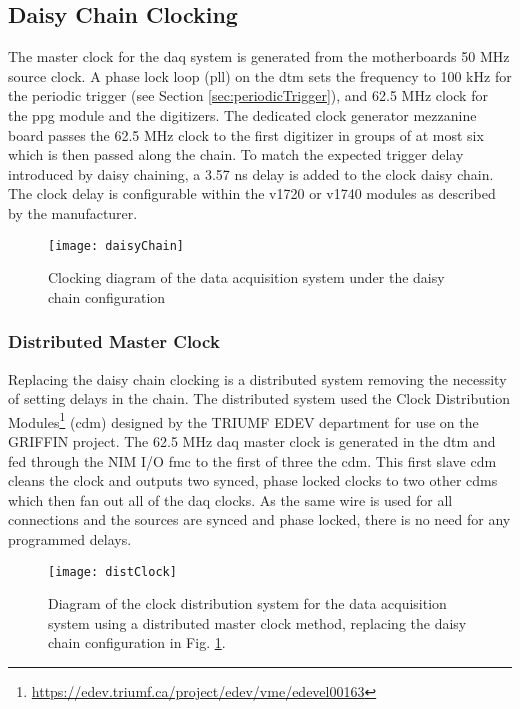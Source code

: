 \subsection{Daisy Chain Clocking}
\label{sec:daisyChainClock}
The master clock for the \gls{daq} system is generated from the motherboards 50 MHz source clock. A phase lock loop (\gls{pll}) on the \gls{dtm} sets the frequency to 100 kHz for the periodic trigger (see Section \ref{sec:periodicTrigger}), and 62.5 MHz clock for the \gls{ppg} module and the digitizers. The dedicated clock generator mezzanine board passes the 62.5 MHz clock to the first digitizer in groups of at most six which is then passed along the chain. To match the expected trigger delay introduced by daisy chaining, a 3.57 ns delay is added to the clock daisy chain. The clock delay is configurable within the \gls{v1720} or \gls{v1740} modules as described by the manufacturer\cite{v1720UM}\cite{v1740UM}. 

\begin{figure}
\centering
\texttt{[image: daisyChain]}
\caption{Clocking diagram of the data acquisition system under the daisy chain configuration}
\label{Fig:daisyChainClock}
\end{figure}

\subsubsection{Distributed Master Clock}
\label{sec:distributedMasterClock}

Replacing the daisy chain clocking is a distributed system removing the necessity of setting delays in the chain. The distributed system used the Clock Distribution Modules\footnote{\url{https://edev.triumf.ca/project/edev/vme/edevel00163}} (\gls{cdm}) designed by the TRIUMF EDEV department for use on the GRIFFIN project. The 62.5 MHz \gls{daq} master clock is generated in the \gls{dtm} and fed through the NIM I/O \gls{fmc} to the first of three the \gls{cdm}. This first slave \gls{cdm} cleans the clock and outputs two synced, phase locked clocks to two other \gls{cdm}s which then fan out all of the \gls{daq} clocks. As the same wire is used for all connections and the sources are synced and phase locked, there is no need for any programmed delays. 


\begin{figure}
\centering
\texttt{[image: distClock]}
\caption{Diagram of the clock distribution system for the data acquisition system using a distributed master clock method, replacing the daisy chain configuration in Fig. \ref{Fig:daisyChainClock}.}
\label{Fig:distClock}
\end{figure}
\clearpage
